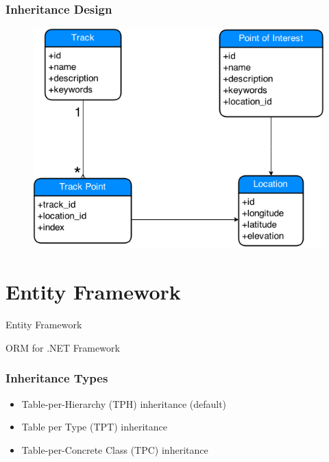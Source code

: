 \documentclass{beamer}
\begin{document}
\begin{frame}
	\frametitle{Inheritance Design}
	\begin{figure}
		\centering
		\includegraphics[scale=0.4]{resources/concise-gps.png}
	\end{figure}
\end{frame}

\section{Entity Framework}

\begin{frame}
	
	\begin{center}
		\Huge Entity Framework
	\end{center}
	\begin{center}
		ORM for .NET Framework
	\end{center}

\end{frame}

\begin{frame}
	\frametitle{Inheritance Types}
	
	\begin{itemize}
		\item Table-per-Hierarchy (TPH) inheritance (default)
		\item Table per Type (TPT) inheritance
		\item Table-per-Concrete Class (TPC) inheritance
	\end{itemize}

\end{frame}
\end{document}
